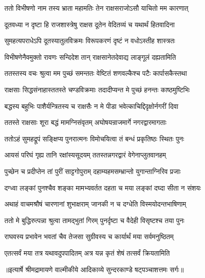 \twolineshloka
{ततो विभीषणो नाम तस्य भ्राता महामतिः}
{तेन राक्षसराजोऽसौ याचितो मम कारणात्} %

\twolineshloka
{दूतवध्या न दृष्टा हि राजशास्त्रेषु राक्षस}
{दूतेन वेदितव्यं च यथार्थं हितवादिना} %

\twolineshloka
{सुमहत्यपराधेऽपि दूतस्यातुलविक्रमः}
{विरूपकरणं दृष्टं न वधोऽस्तीह शास्त्रतः} %

\twolineshloka
{विभीषणेनैवमुक्तो रावणः सन्दिदेश तान्}
{राक्षसानेतदेवाद्य लाङ्गूलं दह्यतामिति} %

\twolineshloka
{ततस्तस्य वचः श्रुत्वा मम पुच्छं समन्ततः}
{वेष्टितं शणवल्कैश्च पटैः कार्पासकैस्तथा} %

\twolineshloka
{राक्षसाः सिद्धसंनाहास्ततस्ते चण्डविक्रमाः}
{तदादीप्यन्त मे पुच्छं हनन्तः काष्ठमुष्टिभिः} %

\twolineshloka
{बद्धस्य बहुभिः पाशैर्यन्त्रितस्य च राक्षसैः}
{न मे पीडा भवेत्काचिद्दिदृक्षोर्नगरीं दिवा} %

\twolineshloka
{ततस्ते राक्षसाः शूरा बद्धं मामग्निसंवृतम्}
{अघोषयन्राजमार्गे नगरद्वारमागताः} %

\twolineshloka
{ततोऽहं सुमहद्रूपं सङ्क्षिप्य पुनरात्मनः}
{विमोचयित्वा तं बन्धं प्रकृतिष्ठः स्थितः पुनः} %

\twolineshloka
{आयसं परिघं गृह्य तानि रक्षांस्यसूदयम्}
{ततस्तन्नगरद्वारं वेगेनाप्लुतवानहम्} %

\twolineshloka
{पुच्छेन च प्रदीप्तेन तां पुरीं साट्टगोपुराम्}
{दहाम्यहमसम्भ्रान्तो युगान्ताग्निरिव प्रजाः} %

\twolineshloka
{दग्ध्वा लङ्कां पुनश्चैव शङ्का मामभ्यवर्तत}
{दहता च मया लङ्कां दघ्दा सीता न संशयः} %

\twolineshloka
{अथाहं वाचमश्रौषं चारणानां शुभाक्षराम्}
{जानकी न च दग्धेति विस्मयोदन्तभाषिणाम्} %

\twolineshloka
{ततो मे बुद्धिरुत्पन्ना श्रुत्वा तामद्भुतां गिरम्}
{पुनर्दृष्टा च वैदेही विसृष्टश्च तया पुनः} %

\twolineshloka
{राघवस्य प्रभावेन भवतां चैव तेजसा}
{सुग्रीवस्य च कार्यार्थं मया सर्वमनुष्ठितम्} %

\twolineshloka
{एतत्सर्वं मया तत्र यथावदुपपादितम्}
{अत्र यन्न कृतं शेषं तत्सर्वं क्रियतामिति} %


{॥इत्यार्षे श्रीमद्रामायणे वाल्मीकीये आदिकाव्ये सुन्दरकाण्डे षट्पञ्चाशत्तमः सर्गः॥}


